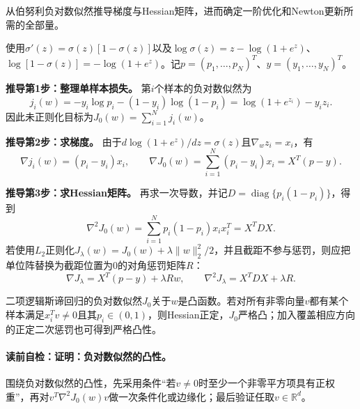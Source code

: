 \label{struct:V2-C05-CH11}

\begin{derivationgoalbox}
从伯努利负对数似然推导梯度与Hessian矩阵，进而确定一阶优化和Newton更新所需的全部量。
\end{derivationgoalbox}
\begin{derivationprepbox}
使用$\sigma'(z)=\sigma(z)[1-\sigma(z)]$以及$\log\sigma(z)=z-\log(1+e^z)$、$\log[1-\sigma(z)]=-\log(1+e^z)$。记$p=(p_1,\ldots,p_N)^T$、$y=(y_1,\ldots,y_N)^T$。
\end{derivationprepbox}

\textbf{推导第1步：整理单样本损失。}
第$i$个样本的负对数似然为
\[
j_i(w)=-y_i\log p_i-(1-y_i)\log(1-p_i)
=\log(1+e^{z_i})-y_i z_i.
\]
因此未正则化目标为$J_0(w)=\sum_{i=1}^{N}j_i(w)$。

\textbf{推导第2步：求梯度。}
由于$d\log(1+e^z)/dz=\sigma(z)$且$\nabla_wz_i=x_i$，有
\[
\nabla j_i(w)=(p_i-y_i)x_i,
\qquad
\nabla J_0(w)=\sum_{i=1}^{N}(p_i-y_i)x_i=X^T(p-y).
\]

\textbf{推导第3步：求Hessian矩阵。}
再求一次导数，并记$D=\operatorname{diag}\{p_i(1-p_i)\}$，得到
\[
\nabla^2J_0(w)=\sum_{i=1}^{N}p_i(1-p_i)x_ix_i^T=X^TDX.
\]
若使用$L_2$正则化$J_\lambda(w)=J_0(w)+\lambda\lVert w\rVert_2^2/2$，并且截距不参与惩罚，则应把单位阵替换为截距位置为0的对角惩罚矩阵$R$：
\[
\nabla J_\lambda=X^T(p-y)+\lambda Rw,
\qquad
\nabla^2J_\lambda=X^TDX+\lambda R.
\]

\begin{theorem}[负对数似然的凸性]\label{thm:V2-C05-convexity}
二项逻辑斯谛回归的负对数似然$J_0$关于$w$是凸函数。若对所有非零向量$v$都有某个样本满足$x_i^Tv\neq0$且其$p_i\in(0,1)$，则Hessian正定，$J_0$严格凸；加入覆盖相应方向的正定二次惩罚也可得到严格凸性。
\end{theorem}

\paragraph{读前自检：证明：负对数似然的凸性。}围绕负对数似然的凸性，先采用条件“若$v\neq0$时至少一个非零平方项具有正权重”，再对$v^T\nabla^2J_0(w)v$做一次条件化或边缘化；最后验证任取$v\in\mathbb R^d$。\par

